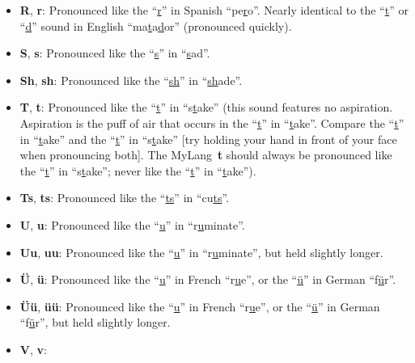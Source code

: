 \documentclass[oneside]{book}
\newcommand{\LanguageName}{MyLang}
\begin{document}
\begin{itemize}
\textbf{Q}, \textbf{q}:
This is likely the most difficult sound in \LanguageName\ for an English speaker to master.
The sound is produced by touching the back of the tongue to the uvula and making a constriction as one would for a \textbf{k}.
One pronounces this sound like any other stop (\textbf{p}, \textbf{t}, \textbf{k}), it's just pronounced further back in the mouth than an English speaker is used to.
Think about when the doctor asks you to go, ``Ahhhhhhh$\ldots$''
Try doing that, and as you're doing it, take the back of your tongue, without moving it, and plug up the opening in the back of your mouth.
That should put you in perfect position to pronounce \textbf{q}.
\item
\textbf{R}, \textbf{r}:
Pronounced like the ``\uline{r}'' in Spanish ``pe\uline{r}o''.
Nearly identical to the ``\uline{t}'' or ``\uline{d}'' sound in English ``ma\uline{t}a\uline{d}or'' (pronounced quickly).
\item
\textbf{S}, \textbf{s}:
Pronounced like the ``\uline{s}'' in ``\uline{s}ad''.
\item
\textbf{Sh}, \textbf{sh}:
Pronounced like the ``\uline{sh}'' in ``\uline{sh}ade''.
\item
\textbf{T}, \textbf{t}:
Pronounced like the ``\uline{t}'' in ``s\uline{t}ake'' (this sound features no aspiration.
Aspiration is the puff of air that occurs in the ``\uline{t}'' in ``\uline{t}ake''.
Compare the ``\uline{t}'' in ``\uline{t}ake'' and the ``\uline{t}'' in ``s\uline{t}ake'' [try holding your hand in front of your face when pronouncing both].
The \LanguageName\ \textbf{t} should always be pronounced like the ``\uline{t}'' in ``s\uline{t}ake'';
never like the ``\uline{t}'' in ``\uline{t}ake'').
\item
\textbf{Ts}, \textbf{ts}:
Pronounced like the ``\uline{ts}'' in ``cu\uline{ts}''.
\item
\textbf{U}, \textbf{u}:
Pronounced like the ``\uline{u}'' in ``r\uline{u}minate''.
\item
\textbf{Uu}, \textbf{uu}:
Pronounced like the ``\uline{u}'' in ``r\uline{u}minate'', but held slightly longer.
\item
\textbf{Ü}, \textbf{ü}:
Pronounced like the ``\uline{u}'' in French ``r\uline{u}e'', or the ``\uline{ü}'' in German ``f\uline{ü}r''.
\item
\textbf{Üü}, \textbf{üü}:
Pronounced like the ``\uline{u}'' in French ``r\uline{u}e'', or the ``\uline{ü}'' in German ``f\uline{ü}r'', but held slightly longer.
\item
\textbf{V}, \textbf{v}:

\end{itemize}
\end{document}
